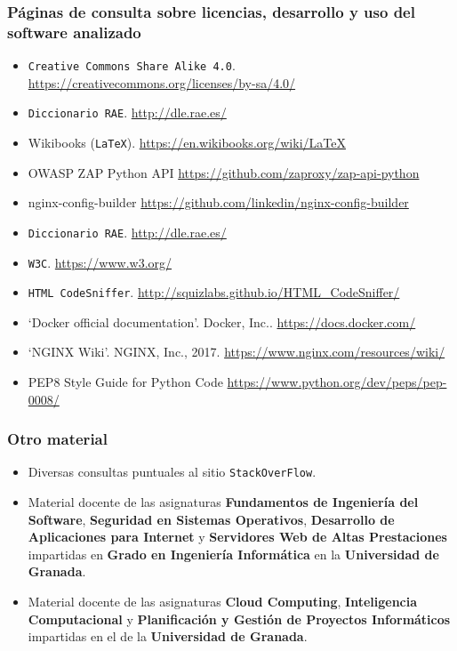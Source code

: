 
\printbibliography[heading=bibempty]

\bigskip
\subsubsection{Páginas de consulta sobre licencias, desarrollo y uso del software analizado}

\begin{itemize}
	\item {\tt Creative Commons Share Alike 4.0}. \url{https://creativecommons.org/licenses/by-sa/4.0/}
	\item {\tt Diccionario RAE}. \url{http://dle.rae.es/}
	\item Wikibooks ({\tt LaTeX}). \url{https://en.wikibooks.org/wiki/LaTeX}
	\item OWASP ZAP Python API \url{https://github.com/zaproxy/zap-api-python}
	\item nginx-config-builder \url{https://github.com/linkedin/nginx-config-builder}
	\item {\tt Diccionario RAE}. \url{http://dle.rae.es/}
	\item {\tt W3C}. \url{https://www.w3.org/}
	\item {\tt HTML CodeSniffer}. \url{http://squizlabs.github.io/HTML_CodeSniffer/}
	\item `Docker official documentation'. Docker, Inc.. \url{https://docs.docker.com/}
	\item `NGINX Wiki'. NGINX, Inc., 2017. \url{https://www.nginx.com/resources/wiki/}
	\item PEP8 Style Guide for Python Code \url{https://www.python.org/dev/peps/pep-0008/}
\end{itemize}
\bigskip
\subsubsection*{Otro material}
\begin{itemize}
	\item Diversas consultas puntuales al sitio {\tt StackOverFlow}.
	\item Material docente de las asignaturas \textbf{Fundamentos de Ingeniería del Software}, \textbf{Seguridad en Sistemas Operativos}, \textbf{Desarrollo de Aplicaciones para Internet} y \textbf{Servidores Web de Altas Prestaciones} impartidas en \textbf{Grado en Ingeniería Informática} en la \textbf{Universidad de Granada}.
	\item Material docente de las asignaturas \textbf{Cloud Computing}, \textbf{Inteligencia Computacional} y \textbf{Planificación y Gestión de Proyectos Informáticos} impartidas en el \master de la \textbf{Universidad de Granada}.
\end{itemize}